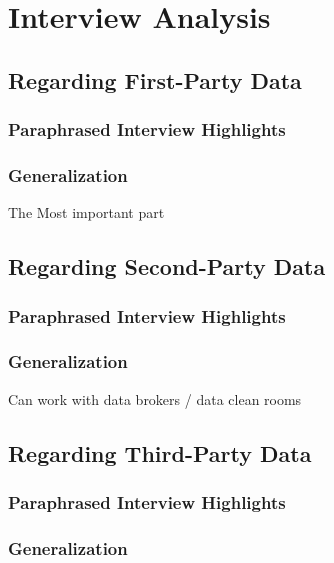 %
%

\pagebreak
\section{Interview Analysis}

\onehalfspacing

\subsection{Regarding First-Party Data}

\subsubsection{Paraphrased Interview Highlights}

\subsubsection{Generalization}

The Most important part

\subsection{Regarding Second-Party Data}

\subsubsection{Paraphrased Interview Highlights}

\subsubsection{Generalization}

Can work with data brokers / data clean rooms

\subsection{Regarding Third-Party Data}

\subsubsection{Paraphrased Interview Highlights}

\subsubsection{Generalization}

